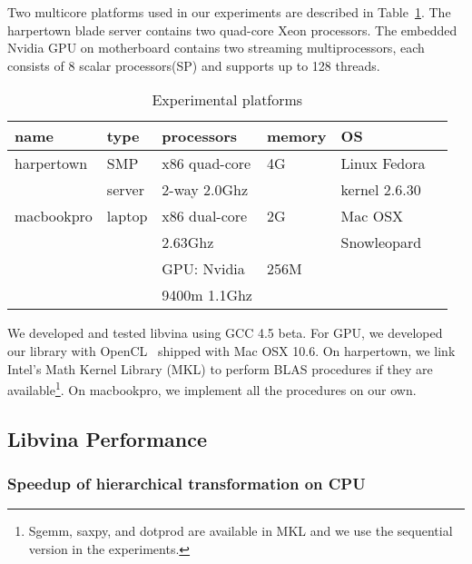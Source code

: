 Two multicore platforms used in our experiments are described in Table~\ref{tbl:mach}.
The harpertown blade server contains two quad-core Xeon processors. 
The embedded Nvidia GPU on motherboard contains two streaming multiprocessors,
each consists of 8 scalar processors(SP) and supports up to 128 threads.

\begin{table}[hbt]
\caption{Experimental platforms}\label{tbl:mach}
\begin{center}
\begin{tabular}{|l|l|l|l|l|r|}
\hline
\textbf{name}&\textbf{type}&\textbf{processors}&\textbf{memory}&\textbf{OS}\\
\hline
harpertown&SMP &x86 quad-core  &4G&Linux Fedora\\
                  &  server &   
2-way  2.0Ghz & &kernel 2.6.30\\
\hline
macbookpro&laptop &x86 dual-core &2G&Mac OSX\\
                    &            & 2.63Ghz         &  &Snowleopard\\
                   &             &GPU: Nvidia      &256M & \\
                    &            &9400m 1.1Ghz     & &\\
\hline
\end{tabular} 
\end{center}
\end{table}

We developed and tested libvina using GCC 4.5 beta.  For GPU, we developed
our library with OpenCL~\cite{opencl} shipped with Mac OSX 10.6. 
On harpertown, we link Intel's Math Kernel Library (MKL) to perform BLAS procedures
if they are available\footnote{Sgemm, saxpy, and dotprod are available
in MKL and we use the sequential version in the experiments.}.
On macbookpro, we implement all the procedures on our own. 


\subsection{Libvina Performance}


\subsubsection{Speedup of hierarchical transformation on CPU}
\label{exp:1}

